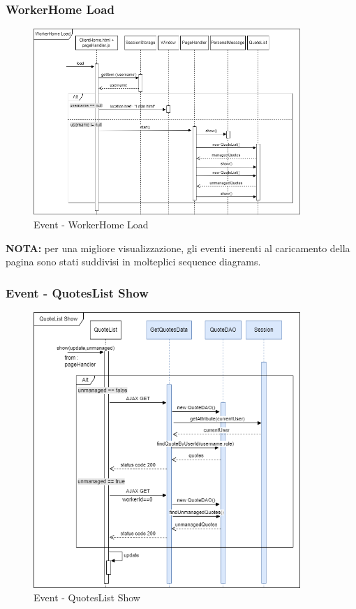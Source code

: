 \documentclass[a4paper, 12pt]{article}
\begin{document}
\subsubsection{WorkerHome Load}
\begin{figure}[h!]
	\centering
	\includegraphics[width=0.9\textwidth]{RIA_images/WorkerHomeLoad.png}
	\caption{Event - WorkerHome Load}
	\label{figure:WorkerHomeLoadRIA}
\end{figure}
\noindent\textbf{NOTA:} per una migliore visualizzazione, gli eventi inerenti al caricamento della pagina sono stati suddivisi in molteplici sequence diagrams.
\subsubsection{Event - QuotesList Show}
\begin{figure}[h!]
	\centering
	\includegraphics[width=0.9\textwidth]{RIA_images/QuoteListShow.png}
	\caption{Event - QuotesList Show}
	\label{figure:QuotesListShowRIA}
\end{figure}
\newpage
\end{document}
